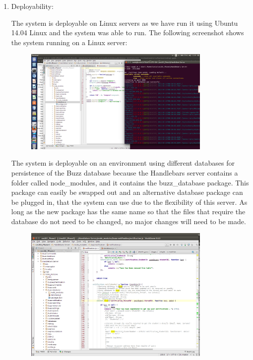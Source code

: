 \documentclass[hidelinks, 12pt, oneside]{article}
\begin{document}
\begin{enumerate}
\item Deployability:

The system is deployable on Linux servers as we have run it using Ubuntu 14.04 Linux and the system was able to run. The following screenshot shows the system running on a Linux server:

\begin{figure}[h!]
  \centering
    \includegraphics[width=0.85\textwidth]{LinuxServerScreenShot} 
\end{figure}

The system is deployable on an environment using different databases for persistence of the Buzz database because the Handlebars server contains a folder called node\_modules, and it contains the buzz\_database package. This package can easily be swapped out and an alternative database package can be plugged in, that the system can use due to the flexibility of this server. As long as the new package has the same name so that the files that require the database do not need to be changed, no major changes will need to be made.  
 

\begin{figure}[h!]
  \centering
    \includegraphics[width=0.85\textwidth]{DatabaseSchema} 
\end{figure}


\end{enumerate}
\end{document}
